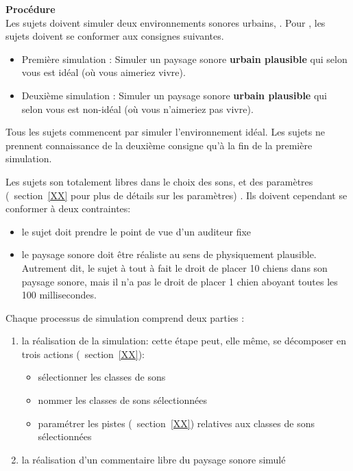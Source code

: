 \textbf{Procédure} \\

Les sujets doivent simuler deux environnements sonores urbains,  . Pour  , les sujets doivent se conformer aux consignes suivantes.

\begin{itemize}
\item Première simulation : Simuler un paysage sonore \textbf{urbain plausible} qui selon vous est idéal (où vous aimeriez vivre).
\item Deuxième simulation : Simuler un paysage sonore \textbf{urbain plausible} qui selon vous est non-idéal (où vous n'aimeriez pas vivre).
\end{itemize}

Tous les sujets commencent par simuler l'environnement idéal. Les sujets ne prennent connaissance de la deuxième consigne qu'à la fin de la première simulation.

Les sujets son totalement libres dans le choix des sons, et des paramètres (\Cf~section~\ref{XX} pour plus de détails sur les paramètres) . Ils doivent cependant se conformer à deux contraintes:

\begin{itemize}
\item le sujet doit prendre le point de vue d’un auditeur fixe

\item le paysage sonore doit être réaliste au sens de physiquement plausible. Autrement dit, le sujet à tout à fait le droit de placer 10 chiens dans son paysage sonore, mais il n’a pas le droit de placer 1 chien aboyant toutes les 100 millisecondes.

\end{itemize}

Chaque processus de simulation comprend deux parties :

\begin{enumerate}
\item la réalisation de la simulation: cette étape peut, elle même, se décomposer en trois actions (\Cf~section~\ref{XX}):
\begin{itemize}
\item sélectionner les classes de sons
\item nommer les classes de sons sélectionnées
\item paramétrer les pistes (\Cf~section~\ref{XX}) relatives aux classes de sons sélectionnées
\end{itemize}
\item la réalisation d'un commentaire libre du paysage sonore simulé
\end{enumerate}

